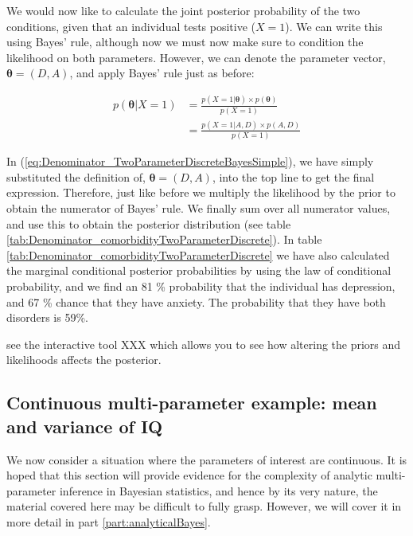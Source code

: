 \documentclass[11pt,fullpage]{book}
\begin{document}
We would now like to calculate the joint posterior probability of the two conditions, given that an individual tests positive ($X=1$). We can write this using Bayes' rule, although now we must now make sure to condition the likelihood on both parameters. However, we can denote the parameter vector, $\boldsymbol{\theta}=(D,A)$, and apply Bayes' rule just as before:

\begin{equation}\label{eq:Denominator_TwoParameterDiscreteBayesSimple}
\begin{align}
p(\boldsymbol{\theta}|X=1) &= \frac{p(X=1|\boldsymbol{\theta})\times p(\boldsymbol{\theta})}{p(X=1)}\\
& = \frac{p(X=1|A,D)\times p(A,D)}{p(X=1)}
\end{align}
\end{equation}

In (\ref{eq:Denominator_TwoParameterDiscreteBayesSimple}), we have simply substituted the definition of, $\boldsymbol{\theta}=(D,A)$, into the top line to get the final expression. Therefore, just like before we multiply the likelihood by the prior to obtain the numerator of Bayes' rule. We finally sum over all numerator values, and use this to obtain the posterior distribution (see table \ref{tab:Denominator_comorbidityTwoParameterDiscrete}). In table \ref{tab:Denominator_comorbidityTwoParameterDiscrete} we have also calculated the marginal conditional posterior probabilities by using the law of conditional probability, and we find an 81 \% probability that the individual has depression, and 67 \% chance that they have anxiety. The probability that they have both disorders is 59\%.

 see the interactive tool XXX which allows you to see how altering the priors and likelihoods affects the posterior.

\subsection{Continuous multi-parameter example: mean and variance of IQ}\label{sec:Denominator_continuousTwoParameterIQ}
We now consider a situation where the parameters of interest are continuous. It is hoped that this section will provide evidence for the complexity of analytic multi-parameter inference in Bayesian statistics, and hence by its very nature, the material covered here may be difficult to fully grasp. However, we will cover it in more detail in part \ref{part:analyticalBayes}.
\end{document}
